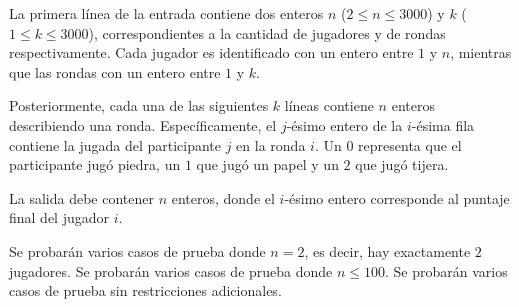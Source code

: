 \documentclass{oci}
\begin{document}
\begin{inputDescription}
  La primera línea de la entrada contiene dos enteros $n$ ($2 \leq n \leq 3000$)
  y $k$ ($1 \leq k \leq 3000$), correspondientes a la cantidad de jugadores y de
  rondas respectivamente.
  Cada jugador es identificado con un entero entre $1$ y $n$, mientras que las rondas
  con un entero entre $1$ y $k$.

  Posteriormente, cada una de las siguientes $k$ líneas contiene $n$ enteros describiendo
  una ronda.  Específicamente, el $j$-ésimo entero de la $i$-ésima fila contiene la jugada
  del participante $j$ en la ronda $i$.
  Un $0$ representa que el participante jugó piedra, un $1$ que jugó un papel y un $2$
  que jugó tijera.
\end{inputDescription}

\begin{outputDescription}
  La salida debe contener $n$ enteros, donde el $i$-ésimo entero corresponde al
  puntaje final del jugador $i$.
\end{outputDescription}

\begin{scoreDescription}
   Se probarán varios casos de prueba donde $n = 2$, es decir, hay exactamente $2$ jugadores.
   Se probarán varios casos de prueba donde $n \leq 100$.
   Se probarán varios casos de prueba sin restricciones adicionales.
\end{scoreDescription}

\begin{sampleDescription}
\end{sampleDescription}
\end{document}
